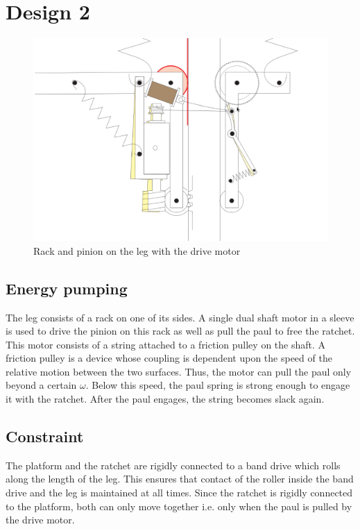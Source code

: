 \section{Design 2}
\begin{figure}[!h]
\centering
\includegraphics[scale=1.8]{fig/seth_design.pdf}
\caption{Rack and pinion on the leg with the drive motor}
\label{fig:3_seth_design}
\end{figure}

\subsection{Energy pumping}
The leg consists of a rack on one of its sides. A single dual shaft motor in a sleeve is used to drive the pinion
on this rack as
well as pull the paul to free the ratchet. This motor consists of a string attached to a friction pulley on the shaft.
A friction pulley is a device whose coupling is dependent upon the speed of the relative motion between the two surfaces.
Thus, the motor can pull the paul only beyond a certain $\omega$. Below this speed, the paul spring is strong enough to
engage it with the ratchet. After the paul engages, the string becomes slack again.

\subsection{Constraint} 
The platform and the ratchet are rigidly connected to a band drive which rolls along
the length of the leg. This ensures that contact of the roller inside the band drive and the leg is maintained at all
times. Since the ratchet is rigidly connected to the platform, both can only move together i.e. only when the paul is
pulled by the drive motor. 

